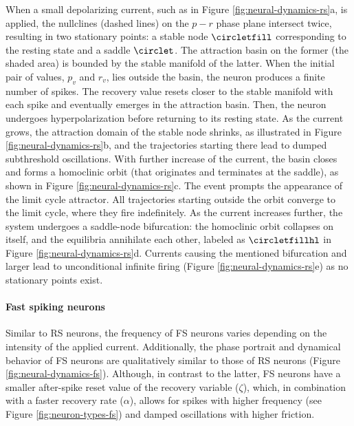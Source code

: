 When a small depolarizing current, such as in Figure \ref{fig:neural-dynamics-rs}a, is applied, the nullclines (dashed lines) on the $p-r$ phase plane intersect twice, resulting in two stationary points: a stable node $\circletfill$ corresponding to the resting state and a saddle $\circlet$. The attraction basin on the former (the shaded area) is bounded by the stable manifold of the latter. When the initial pair of values, $p_v$ and $r_v$, lies outside the basin, the neuron produces a finite number of spikes. The recovery value resets closer to the stable manifold with each spike and eventually emerges in the attraction basin. Then, the neuron undergoes hyperpolarization before returning to its resting state. As the current grows, the attraction domain of the stable node shrinks, as illustrated in Figure \ref{fig:neural-dynamics-rs}b, and the trajectories starting there lead to dumped subthreshold oscillations. With further increase of the current, the basin closes and forms a homoclinic orbit (that originates and terminates at the saddle), as shown in Figure \ref{fig:neural-dynamics-rs}c. The event prompts the appearance of the limit cycle attractor. All trajectories starting outside the orbit converge to the limit cycle, where they fire indefinitely. As the current increases further, the system undergoes a saddle-node bifurcation: the homoclinic orbit collapses on itself, and the equilibria annihilate each other, labeled as $\circletfillhl$ in Figure \ref{fig:neural-dynamics-rs}d. Currents causing the mentioned bifurcation and larger lead to unconditional infinite firing (Figure \ref{fig:neural-dynamics-rs}e) as no stationary points exist.


\paragraph{Fast spiking neurons}

Similar to RS neurons, the frequency of FS neurons varies depending on the intensity of the applied current. Additionally, the phase portrait and dynamical behavior of FS neurons are qualitatively similar to those of RS neurons (Figure \ref{fig:neural-dynamics-fs}). Although, in contrast to the latter, FS neurons have a smaller after-spike reset value of the recovery variable ($\zeta$), which, in combination with a faster recovery rate ($\alpha$), allows for spikes with higher frequency (see Figure \ref{fig:neuron-types-fs}) and damped oscillations with higher friction.